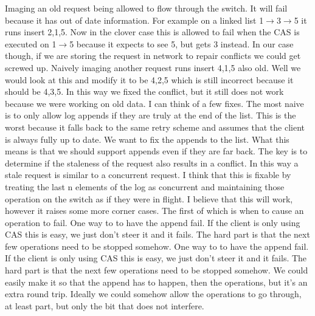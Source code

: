 Imaging an old request being allowed to flow through the switch. It will fail
because it has out of date information. For example on a linked list 1$\rightarrow$3$\rightarrow$5 it
runs insert 2,1,5. Now in the clover case this is allowed to fail when the CAS
is executed on 1$\rightarrow$5 because it expects to see 5, but gets 3 instead. In our case
though, if we are storing the request in network to repair conflicts we could
get screwed up. Naively imaging another request runs insert 4,1,5 also old.
Well we would look at this and modify it to be 4,2,5 which is still incorrect
because it should be 4,3,5. In this way we fixed the conflict, but it still does
not work because we were working on old data. I can think of a few fixes. The
most naive is to only allow log appends if they are truly at the end of the
list. This is the worst because it falls back to the same retry scheme and
assumes that the client is always fully up to date. We want to fix the appends
to the list. What this means is that we should support appends even if they are
far back. The key is to determine if the staleness of the request also results
in a conflict. In this way a stale request is similar to a concurrent request. I
think that this is fixable by treating the last n elements of the log as
concurrent and maintaining those operation on the switch as if they were in
flight. I believe that this will work, however it raises some more corner cases.
The first of which is when to cause an operation to fail. One way to to have the
append fail. If the client is only using CAS this is easy, we just don't steer
it and it fails. The hard part is that the next few operations need to be
stopped somehow.  One way to to have the append fail. If the client is only
using CAS this is easy, we just don't steer it and it fails. The hard part is
that the next few operations need to be stopped somehow. We could easily make it
so that the append has to happen, then the operations, but it's an extra round
trip. Ideally we could somehow allow the operations to go through, at least
part, but only the bit that does not interfere.